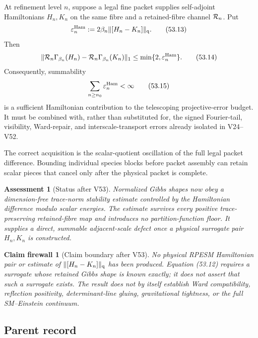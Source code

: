 \documentclass[11pt]{article}
\newtheorem{firewall}[theorem]{Claim firewall}
\newtheorem{assessment}[theorem]{Assessment}
\theoremstyle{remark}
\begin{document}
At refinement level \(n\), suppose a legal fine packet supplies
self-adjoint Hamiltonians \(H_n,K_n\) on the same fibre and a
retained-fibre channel \({\cal R}_n\).  Put
\begin{equation}
 \varepsilon_n^{\rm Ham}
 :=
 2\beta_n\|[H_n-K_n]\|_{\rm q}.                   \tag{53.13}
\end{equation}
Then
\begin{equation}
 \|{\cal R}_n\Gamma_{\beta_n}(H_n)
      -{\cal R}_n\Gamma_{\beta_n}(K_n)\|_1
 \leq\min\{2,\varepsilon_n^{\rm Ham}\}.           \tag{53.14}
\end{equation}
Consequently, summability
\begin{equation}
 \sum_{n\geq n_0}\varepsilon_n^{\rm Ham}<\infty   \tag{53.15}
\end{equation}
is a sufficient Hamiltonian contribution to the telescoping
projective-error budget.  It must be combined with, rather than
substituted for, the signed Fourier-tail, visibility, Ward-repair,
and interscale-transport errors already isolated in V24--V52.

The correct acquisition is the scalar-quotient oscillation of the
full legal packet difference.  Bounding individual species blocks
before packet assembly can retain scalar pieces that cancel only
after the physical packet is complete.

\begin{assessment}[Status after V53]
\label{ass:v12v53-status}
Normalized Gibbs shapes now obey a dimension-free trace-norm
stability estimate controlled by the Hamiltonian difference modulo
scalar energies.  The estimate survives every positive
trace-preserving retained-fibre map and introduces no
partition-function floor.  It supplies a direct, summable
adjacent-scale defect once a physical surrogate pair \(H_n,K_n\) is
constructed.
\end{assessment}

\begin{firewall}[Claim boundary after V53]
\label{fire:v12v53-claim}
No physical RPESM Hamiltonian pair or estimate of
\(\|[H_n-K_n]\|_{\rm q}\) has been produced.  Equation (53.12)
requires a surrogate whose retained Gibbs shape is known exactly;
it does not assert that such a surrogate exists.  The result does
not by itself establish Ward compatibility, reflection positivity,
determinant-line gluing, gravitational tightness, or the full
SM--Einstein continuum.
\end{firewall}

\subsection{Parent record}
\end{document}
